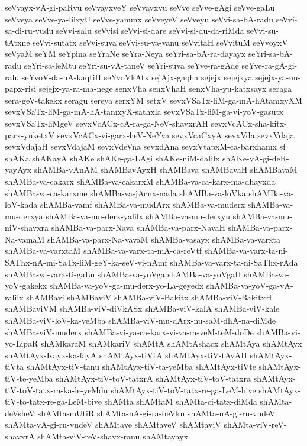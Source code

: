 {seVvayx-vA-gi-paRvu
seVvayxveY
seVvayxvu
seVve
seVve-gAgi
seVve-gaLu
seVveya
seVve-ya-lilxyU
seVve-yanunx
seVveyeV
seVveyu
seVvi-sa-bA-radu
seVvi-sa-di-ru-vudu
seVvi-salu
seVvisi
seVvi-si-dare
seVvi-si-du-da-riMda
seVvi-su-tAtxne
seVvi-sutatx
seVvi-suva
seVvi-su-va-vanu
seVvitaH
seVvituM
seVvoyxV
seVyaM
seYM
seYpina
seYraNe
seYra-Neya
seYri-sa-bA-ra-dayayx
seYri-sa-bA-radu
seYri-sa-leMtu
seYri-su-vA-taneV
seYri-suva
seYve-ra-gAde
seYve-ra-gA-gi-ralu
seYvoV-da-nA-kaqtiH
seYvoVkAtx
sejAjx-gaqha
sejejx
sejejxya
sejejx-ya-nu-papx-risi
sejejx-ya-ra-ma-nege
senxVha
senxVhaH
senxVha-yu-katxsayx
seraga
sera-geV-takekx
seragu
sereya
serxYM
setxV
sevxVSaTx-liM-ga-mA-hAtamxyXM
sevxVSaTx-liM-ga-mA-hA-tamxyX-sathxla
sevxVSaTx-liM-ga-vi-yoV-gasutx
sevxVSaTx-liMgeV
sevxVcACx-cA-ra-ga-NeV-shavxrAH
sevxVcACx-sha-kitx-parx-yuketxV
sevxVcACx-vi-garx-heV-NeYva
sevxVcaCxyA
sevxVda
sevxVdaja
sevxVdajaH
sevxVdajaM
sevxVdeVna
sevxdAna
seyxVtapxM-ca-barxhamx
sf
shAKa
shAKayA
shAKe
shAKe-ga-LAgi
shAKe-niM-dalilx
shAKe-yA-gi-deR-yayAyx
shAMBa-vAnAM
shAMBavAyxH
shAMBava
shAMBavaH
shAMBavaM
shAMBa-va-cakarx
shAMBa-va-cakarxM
shAMBa-va-ca-karx-ma-dhayxda
shAMBa-va-ca-karxme
shAMBa-va-jAcnx-nada
shAMBa-va-loVka
shAMBa-va-loV-kada
shAMBa-vamf
shAMBa-va-mudArx
shAMBa-va-muderx
shAMBa-va-mu-derxya
shAMBa-va-mu-derx-yalilx
shAMBa-va-mu-derxyu
shAMBa-va-mu-niV-shavxra
shAMBa-va-parx-Nava
shAMBa-va-parx-NavaH
shAMBa-va-parx-Na-vamaM
shAMBa-va-parx-Na-vavaM
shAMBa-vasayx
shAMBa-va-varxta
shAMBa-va-varxtaM
shAMBa-va-varx-ta-mA-ca-reVtf
shAMBa-va-varx-ta-ni-SAThx-nA-mi-SaTx-liM-geY-ka-seV-vi-nAmf
shAMBa-va-varx-ta-ni-SaThx-rAda
shAMBa-va-varx-ti-gaLu
shAMBa-va-yoVga
shAMBa-va-yoVgaH
shAMBa-va-yoV-gakekx
shAMBa-va-yoV-ga-mu-derx-yo-La-geyedx
shAMBa-va-yoV-ga-vA-ralilx
shAMBavi
shAMBaviV
shAMBa-viV-Bakitx
shAMBa-viV-BakitxH
shAMBaviVM
shAMBa-viV-diVkASx
shAMBa-viV-kalA
shAMBa-viV-kale
shAMBa-viV-loV-ka-veMba
shAMBa-viV-mu-dArx-nu-saM-dhA-na-diMde
shAMBa-viV-muderx
shAMBa-vi-ya-ca-karx-vi-va-ra-veM-teM-doDe
shAMBa-vi-yo-LipaR
shAMkaraM
shAMkariV
shAMtA
shAMtAshacx
shAMtAya
shAMtAyx
shAMtAyx-Kayx-ka-layA
shAMtAyx-tiVtA
shAMtAyx-tiV-tAyAH
shAMtAyx-tiVta
shAMtAyx-tiV-tanu
shAMtAyx-tiV-ta-yeMba
shAMtAyx-tiVte
shAMtAyx-tiV-te-yeMba
shAMtAyx-tiV-toV-tatxrA
shAMtAyx-tiV-toV-tatxra
shAMtAyx-tiV-toV-tatx-ra-ka-le-yeMdu
shAMtAyx-tiV-toV-tatx-re-ga-LeM-bive
shAMtAyx-tiV-to-tatx-re-ga-LeM-bive
shAMta
shAMtaM
shAMta-ci-tatx-diMda
shAMta-deVsheV
shAMta-mUtiR
shAMta-nA-gi-ra-beVku
shAMta-nA-gi-ru-vudeV
shAMta-vA-gi-ru-vudeV
shAMtave
shAMtaveV
shAMtaviV
shAMta-viV-reV-shavxrA
shAMta-viV-reV-shavx-ranu
shAMtayayx
}
